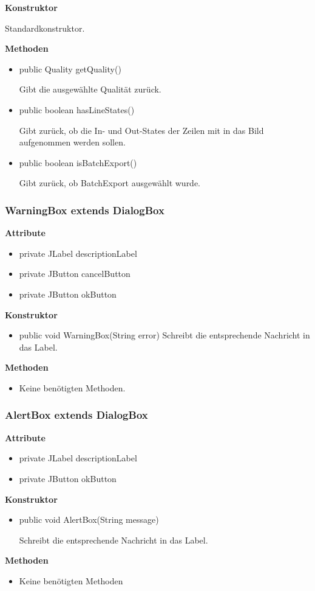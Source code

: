 \textbf{Konstruktor}\par
Standardkonstruktor.

\textbf{Methoden}
\begin{itemize}
	\item public Quality getQuality()\par
		Gibt die ausgewählte Qualität zurück.
	\item public boolean hasLineStates()\par
		Gibt zurück, ob die In- und Out-States der Zeilen mit in das Bild aufgenommen werden sollen.
	\item public boolean isBatchExport()\par
		Gibt zurück, ob BatchExport ausgewählt wurde.
\end{itemize}


\subsubsection{WarningBox extends DialogBox}
\textbf{Attribute}
\begin{itemize}
	\item private JLabel descriptionLabel
	\item private JButton cancelButton
	\item private JButton okButton
\end{itemize}

\textbf{Konstruktor}
\begin{itemize}
	\item public void WarningBox(String error)
	Schreibt die entsprechende Nachricht in das Label.
\end{itemize}

\textbf{Methoden}
\begin{itemize}
	\item Keine benötigten Methoden.
\end{itemize}

\subsubsection{AlertBox extends DialogBox}
\textbf{Attribute}
\begin{itemize}
	\item private JLabel descriptionLabel
	\item private JButton okButton
\end{itemize}

\textbf{Konstruktor}
\begin{itemize}
	\item public void AlertBox(String message)\par
	Schreibt die entsprechende Nachricht in das Label.
\end{itemize}

\textbf{Methoden}
\begin{itemize}
	\item Keine benötigten Methoden
\end{itemize}


